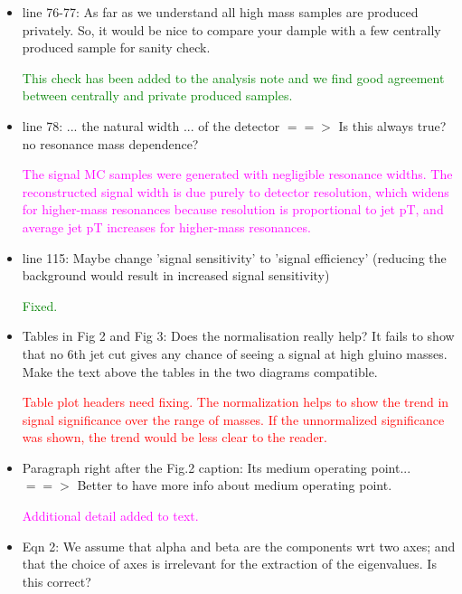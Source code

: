 \documentclass[paper=a4, fontsize=11pt]{scrartcl}
\begin{document}
\begin{itemize}
\item line 76-77: As far as we understand all high mass samples are produced privately. So, it would be nice to compare your dample with a few centrally produced sample for sanity check.

\textcolor{green}{This check has been added to the analysis note and we find good agreement between 
centrally and private produced samples.}

\item line 78: ... the natural width ... of the detector $==>$ Is this always true? no resonance mass dependence?

\textcolor{magenta}{The signal MC samples were generated with negligible
resonance widths. The reconstructed signal width is due purely to 
detector resolution, which widens for higher-mass resonances
because resolution is proportional to jet pT, and average jet pT increases for
higher-mass resonances.}\\


\item line 115: Maybe change 'signal sensitivity' to 'signal efficiency' (reducing the background would result in increased signal sensitivity)

\textcolor{green}{Fixed.}\\

\item Tables in Fig 2 and Fig 3: Does the normalisation really help? It fails to show that no 6th jet cut gives any chance of seeing a signal at high gluino masses. Make the text above the tables in the two diagrams compatible.

\textcolor{red}{Table plot headers need fixing. The normalization helps to
show the trend in signal significance over the range of masses. If the
unnormalized significance was shown, the trend would be less clear to the reader.}\\

\item Paragraph right after the Fig.2 caption: Its medium operating point... $==>$ Better to have more info about medium operating point.

\textcolor{magenta}{Additional detail added to text.}\\

\item Eqn 2: We assume that alpha and beta are the components wrt two axes; and that the choice of axes is irrelevant for the extraction of the eigenvalues. Is this correct?


\end{itemize}
\end{document}
